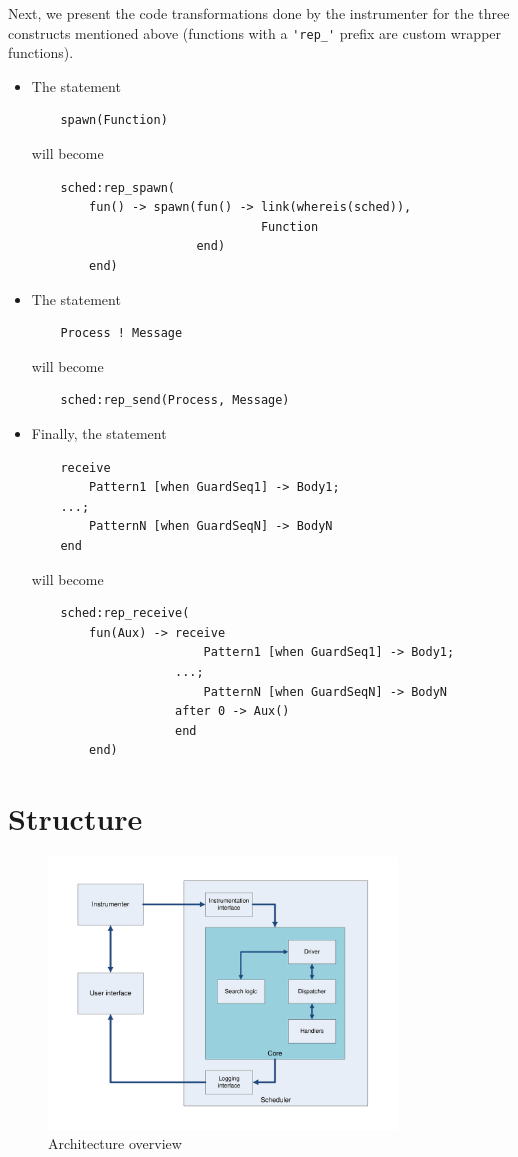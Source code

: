 \documentclass[a4paper,10pt]{article}
\begin{document}
Next, we present the code transformations done by the instrumenter for the three constructs mentioned above
(functions with a \lstinline+'rep_'+ prefix are custom wrapper functions).

\begin{itemize}
	\item The statement
	\begin{lstlisting}
    spawn(Function)
	\end{lstlisting}
	will become
	\begin{lstlisting}
    sched:rep_spawn(
        fun() -> spawn(fun() -> link(whereis(sched)),
                                Function
                       end)
        end)
	\end{lstlisting}
	
	\item The statement
	\begin{lstlisting}
    Process ! Message
	\end{lstlisting}
	will become
	\begin{lstlisting}
    sched:rep_send(Process, Message)
	\end{lstlisting}
	
	\item Finally, the statement
	\begin{lstlisting}
    receive
        Pattern1 [when GuardSeq1] -> Body1;
    ...;
        PatternN [when GuardSeqN] -> BodyN
    end
	\end{lstlisting}
	will become
	\begin{lstlisting}
    sched:rep_receive(
        fun(Aux) -> receive
                        Pattern1 [when GuardSeq1] -> Body1;
                    ...;
                        PatternN [when GuardSeqN] -> BodyN
                    after 0 -> Aux()
                    end
        end)
	\end{lstlisting}
\end{itemize}

\section{Structure}

\begin{center}
\begin{figure}[htb]
	\includegraphics[width=350px]{pra1_arch}
	\caption{Architecture overview}
\end{figure}
\end{center}
\end{document}
